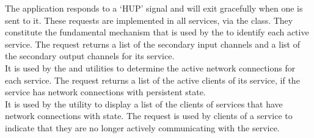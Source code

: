 The  application responds to a `HUP'
signal and will exit gracefully when one is sent to it.
\secondaryEnd{}
These requests are implemented in all \mplusm{} services, via the
 class.
They constitute the fundamental mechanism that is used by the
 to identify each active service.
The  request returns a list of the secondary input
channels and a list of the secondary output channels for its service.\\

It is used by the  and
 utilities to determine the active \yarp{}
network connections for each service.
The  request returns a list of the active clients of
its service, if the service has \yarp{} network connections with persistent state.\\

It is used by the  utility to display a list of the clients
of services that have \yarp{} network connections with state.
The  request is used by clients of a service to
indicate that they are no longer actively communicating with the service.\\

